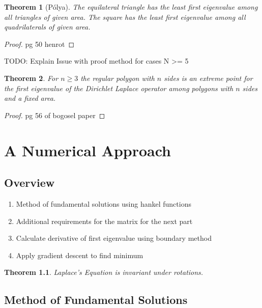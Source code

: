 \documentclass[12pt]{report}
\newtheorem{theorem}{Theorem}[section]
\numberwithin{definition}{section}
\begin{document}
\begin{theorem}[Pólya]
  The equilateral triangle has the least first eigenvalue among all triangles of given area.
  The square has the least first eigenvalue among all quadrilaterals of given area.
\end{theorem}

\begin{proof}
  pg 50 henrot
\end{proof}

TODO: Explain Issue with proof method for cases N >= 5

\begin{theorem}
  For $n \geq 3$ the regular polygon with $n$ sides is an extreme point for the first eigenvalue of the Dirichlet Laplace operator among polygons with $n$ sides and a fixed area.
\end{theorem}

\begin{proof}
  pg 56 of bogosel paper
\end{proof}

\break



\chapter{A Numerical Approach}
\break

\section{Overview}
\begin{enumerate}
  \item Method of fundamental solutions using hankel functions
  \item Additional requirements for the matrix for the next part
  \item Calculate derivative of first eigenvalue using boundary method
  \item Apply gradient descent to find minimum
\end{enumerate}


\begin{theorem}
  Laplace's Equation is invariant under rotations.
\end{theorem}

\break

\section {Method of Fundamental Solutions}
\end{document}
